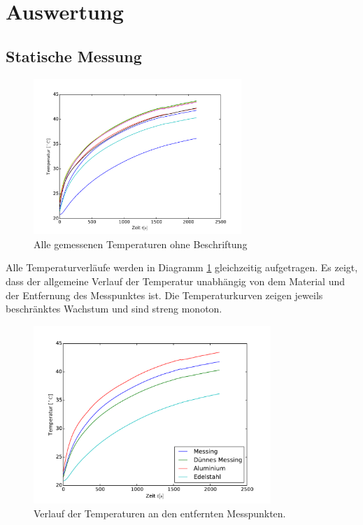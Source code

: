 \section{Auswertung}
\label{sec:Auswertung}
\subsection{Statische Messung}
\begin{figure}
	\centering
	\includegraphics[width=0.7\textwidth]{Bilder/M1_Overview.pdf}
	\caption{Alle gemessenen Temperaturen ohne Beschriftung}
	\label{fig:overview1}
\end{figure}
Alle Temperaturverläufe werden in Diagramm \ref{fig:overview1} gleichzeitig aufgetragen. Es zeigt, dass der allgemeine Verlauf der Temperatur unabhängig von dem Material und der Entfernung des Messpunktes ist. Die Temperaturkurven zeigen jeweils beschränktes Wachstum und sind streng monoton.
\begin{figure}[p]
	\centering
	\includegraphics[width=0.8\textwidth]{Bilder/M1_Tempverl.pdf}
	\caption{Verlauf der Temperaturen an den entfernten Messpunkten.}
	\label{fig:entftemp}
\end{figure}
